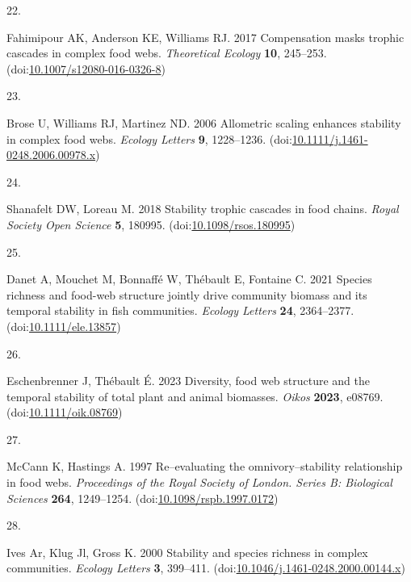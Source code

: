 \documentclass[
]{article}
\newlength{\cslhangindent}
\newlength{\csllabelwidth}
\newlength{\cslentryspacingunit} %
\newenvironment{CSLReferences}[2] %
 {%
  \setlength{\parindent}{0pt}
  \ifodd #1
  \let\oldpar\par
  \def\par{\hangindent=\cslhangindent\oldpar}
  \fi
  \setlength{\parskip}{#2\cslentryspacingunit}
 }%
 {}
\newcommand{\CSLLeftMargin}[1]{\parbox[t]{\csllabelwidth}{#1}}
\newcommand{\CSLRightInline}[1]{\parbox[t]{\linewidth - \csllabelwidth}{#1}\break}
\begin{document}
\begin{CSLReferences}{0}{0}
\leavevmode{}%
\CSLLeftMargin{22. }%
\CSLRightInline{Fahimipour AK, Anderson KE, Williams RJ. 2017 Compensation masks trophic cascades in complex food webs. \emph{Theoretical Ecology} \textbf{10}, 245--253. (doi:\href{https://doi.org/10.1007/s12080-016-0326-8}{10.1007/s12080-016-0326-8})}

\leavevmode{}%
\CSLLeftMargin{23. }%
\CSLRightInline{Brose U, Williams RJ, Martinez ND. 2006 Allometric scaling enhances stability in complex food webs. \emph{Ecology Letters} \textbf{9}, 1228--1236. (doi:\href{https://doi.org/10.1111/j.1461-0248.2006.00978.x}{10.1111/j.1461-0248.2006.00978.x})}

\leavevmode{}%
\CSLLeftMargin{24. }%
\CSLRightInline{Shanafelt DW, Loreau M. 2018 Stability trophic cascades in food chains. \emph{Royal Society Open Science} \textbf{5}, 180995. (doi:\href{https://doi.org/10.1098/rsos.180995}{10.1098/rsos.180995})}

\leavevmode{}%
\CSLLeftMargin{25. }%
\CSLRightInline{Danet A, Mouchet M, Bonnaffé W, Thébault E, Fontaine C. 2021 Species richness and food-web structure jointly drive community biomass and its temporal stability in fish communities. \emph{Ecology Letters} \textbf{24}, 2364--2377. (doi:\href{https://doi.org/10.1111/ele.13857}{10.1111/ele.13857})}

\leavevmode{}%
\CSLLeftMargin{26. }%
\CSLRightInline{Eschenbrenner J, Thébault É. 2023 Diversity, food web structure and the temporal stability of total plant and animal biomasses. \emph{Oikos} \textbf{2023}, e08769. (doi:\href{https://doi.org/10.1111/oik.08769}{10.1111/oik.08769})}

\leavevmode{}%
\CSLLeftMargin{27. }%
\CSLRightInline{McCann K, Hastings A. 1997 Re--evaluating the omnivory--stability relationship in food webs. \emph{Proceedings of the Royal Society of London. Series B: Biological Sciences} \textbf{264}, 1249--1254. (doi:\href{https://doi.org/10.1098/rspb.1997.0172}{10.1098/rspb.1997.0172})}

\leavevmode{}%
\CSLLeftMargin{28. }%
\CSLRightInline{Ives Ar, Klug Jl, Gross K. 2000 Stability and species richness in complex communities. \emph{Ecology Letters} \textbf{3}, 399--411. (doi:\href{https://doi.org/10.1046/j.1461-0248.2000.00144.x}{10.1046/j.1461-0248.2000.00144.x})}


\end{CSLReferences}
\end{document}
